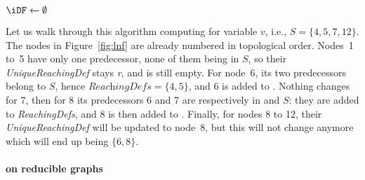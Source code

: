 {%

\begin{algorithm}
  \caption{%
  Ramalingam's algorithm for \iDF in an acyclic graph.}
  \label{algo:ramaIDF}

  $\iDF \gets \emptyset$\;
  \Return{$\iDF$}   
\end{algorithm}

Let us walk through this algorithm computing \iDF for variable $v$, i.e., $S = \{4,5,7,12\}$. 
The nodes in Figure~\ref{fig:lnf} are already numbered in topological order. 
Nodes~1 to~5 have only one predecessor, none of them being in $S$, so their \textit{UniqueReachingDef} stays \textit{r}, and \iDF is still empty. 
For node~6, its two predecessors belong to $S$, hence $\textit{ReachingDefs} = \{4,5\}$, and 6 is added to \iDF. 
Nothing changes for 7, then for 8 its predecessors 6 and 7 are respectively in \iDF and $S$: 
they are added to \textit{ReachingDefs}, and 8 is then added to \iDF. 
Finally, for nodes 8 to 12, their \textit{UniqueReachingDef} will be updated to node~8, but this will not change \iDF anymore which will end up being $\{6,8\}$.

\paragraph{\iDF on reducible graphs}

}

